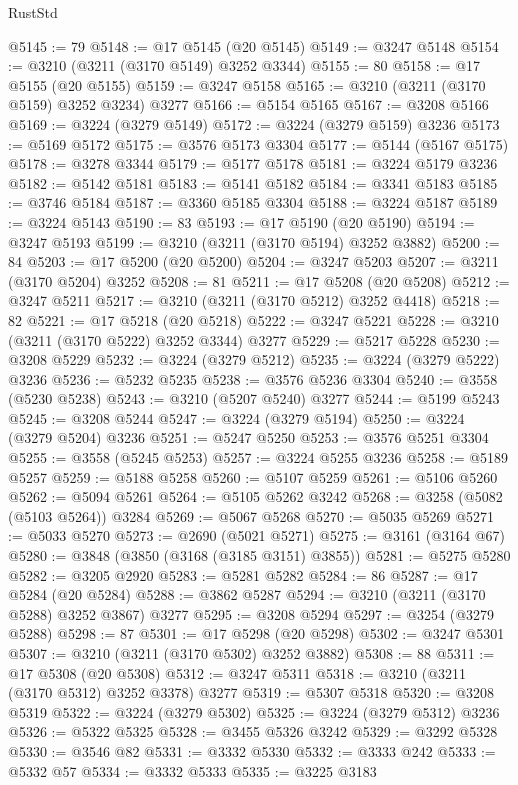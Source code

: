 \begin{lexlean}{RustStd}
\begin{coremodule}
@5145 := 79
@5148 := @17 @5145 (@20 @5145)
@5149 := @3247 @5148
@5154 := @3210 (@3211 (@3170 @5149) @3252 @3344)
@5155 := 80
@5158 := @17 @5155 (@20 @5155)
@5159 := @3247 @5158
@5165 := @3210 (@3211 (@3170 @5159) @3252 @3234) @3277
@5166 := @5154 @5165
@5167 := @3208 @5166
@5169 := @3224 (@3279 @5149)
@5172 := @3224 (@3279 @5159) @3236
@5173 := @5169 @5172
@5175 := @3576 @5173 @3304
@5177 := @5144 (@5167 @5175)
@5178 := @3278 @3344
@5179 := @5177 @5178
@5181 := @3224 @5179 @3236
@5182 := @5142 @5181
@5183 := @5141 @5182
@5184 := @3341 @5183
@5185 := @3746 @5184
@5187 := @3360 @5185 @3304
@5188 := @3224 @5187
@5189 := @3224 @5143
@5190 := 83
@5193 := @17 @5190 (@20 @5190)
@5194 := @3247 @5193
@5199 := @3210 (@3211 (@3170 @5194) @3252 @3882)
@5200 := 84
@5203 := @17 @5200 (@20 @5200)
@5204 := @3247 @5203
@5207 := @3211 (@3170 @5204) @3252
@5208 := 81
@5211 := @17 @5208 (@20 @5208)
@5212 := @3247 @5211
@5217 := @3210 (@3211 (@3170 @5212) @3252 @4418)
@5218 := 82
@5221 := @17 @5218 (@20 @5218)
@5222 := @3247 @5221
@5228 := @3210 (@3211 (@3170 @5222) @3252 @3344) @3277
@5229 := @5217 @5228
@5230 := @3208 @5229
@5232 := @3224 (@3279 @5212)
@5235 := @3224 (@3279 @5222) @3236
@5236 := @5232 @5235
@5238 := @3576 @5236 @3304
@5240 := @3558 (@5230 @5238)
@5243 := @3210 (@5207 @5240) @3277
@5244 := @5199 @5243
@5245 := @3208 @5244
@5247 := @3224 (@3279 @5194)
@5250 := @3224 (@3279 @5204) @3236
@5251 := @5247 @5250
@5253 := @3576 @5251 @3304
@5255 := @3558 (@5245 @5253)
@5257 := @3224 @5255 @3236
@5258 := @5189 @5257
@5259 := @5188 @5258
@5260 := @5107 @5259
@5261 := @5106 @5260
@5262 := @5094 @5261
@5264 := @5105 @5262 @3242
@5268 := @3258 (@5082 (@5103 @5264)) @3284
@5269 := @5067 @5268
@5270 := @5035 @5269
@5271 := @5033 @5270
@5273 := @2690 (@5021 @5271)
@5275 := @3161 (@3164 @67)
@5280 := @3848 (@3850 (@3168 (@3185 @3151) @3855))
@5281 := @5275 @5280
@5282 := @3205 @2920
@5283 := @5281 @5282
@5284 := 86
@5287 := @17 @5284 (@20 @5284)
@5288 := @3862 @5287
@5294 := @3210 (@3211 (@3170 @5288) @3252 @3867) @3277
@5295 := @3208 @5294
@5297 := @3254 (@3279 @5288)
@5298 := 87
@5301 := @17 @5298 (@20 @5298)
@5302 := @3247 @5301
@5307 := @3210 (@3211 (@3170 @5302) @3252 @3882)
@5308 := 88
@5311 := @17 @5308 (@20 @5308)
@5312 := @3247 @5311
@5318 := @3210 (@3211 (@3170 @5312) @3252 @3378) @3277
@5319 := @5307 @5318
@5320 := @3208 @5319
@5322 := @3224 (@3279 @5302)
@5325 := @3224 (@3279 @5312) @3236
@5326 := @5322 @5325
@5328 := @3455 @5326 @3242
@5329 := @3292 @5328
@5330 := @3546 @82
@5331 := @3332 @5330
@5332 := @3333 @242
@5333 := @5332 @57
@5334 := @3332 @5333
@5335 := @3225 @3183

\end{coremodule}
\end{lexlean}
